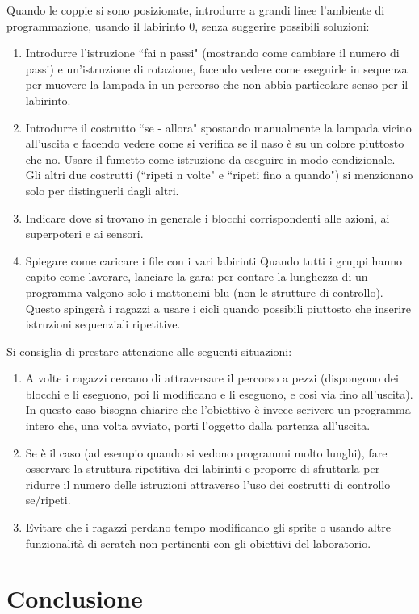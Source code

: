 \documentclass[12pt]{article}
\begin{document}
Quando le coppie si sono posizionate, introdurre a grandi linee l’ambiente di programmazione, usando il labirinto 0, senza suggerire possibili soluzioni:
\begin{enumerate}
\item Introdurre l’istruzione ``fai n passi" (mostrando come cambiare il numero di passi) e un’istruzione di rotazione, facendo vedere come eseguirle in sequenza per muovere la lampada in un percorso che non abbia particolare senso per il labirinto.
\item Introdurre il costrutto ``se - allora" spostando manualmente la lampada vicino all'uscita e facendo vedere come si veriﬁca se il naso è su un colore piuttosto che no. Usare il fumetto come istruzione da eseguire in modo condizionale. Gli altri due costrutti (``ripeti n volte" e ``ripeti ﬁno a quando") si menzionano solo per distinguerli dagli altri.
\item Indicare dove si trovano in generale i blocchi corrispondenti alle azioni, ai superpoteri e ai sensori.
\item Spiegare come caricare i ﬁle con i vari labirinti Quando tutti i gruppi hanno capito come lavorare, lanciare la gara: per contare la lunghezza di un programma valgono solo i mattoncini blu (non le strutture di controllo). Questo spingerà i ragazzi a usare i cicli quando possibili piuttosto che inserire istruzioni sequenziali ripetitive.
\end{enumerate}

Si consiglia di prestare attenzione alle seguenti situazioni:
\begin{enumerate}
\item A volte i ragazzi cercano di attraversare il percorso a pezzi (dispongono dei blocchi e li eseguono, poi li modiﬁcano e li eseguono, e così via ﬁno all’uscita). In questo caso bisogna chiarire che l’obiettivo è invece scrivere un programma intero che, una volta avviato, porti l’oggetto dalla partenza all’uscita.
\item Se è il caso (ad esempio quando si vedono programmi molto lunghi), fare osservare la struttura ripetitiva dei labirinti e proporre di sfruttarla per ridurre il numero delle istruzioni attraverso l’uso dei costrutti di controllo se/ripeti.
\item Evitare che i ragazzi perdano tempo modiﬁcando gli sprite o usando altre funzionalità di scratch non pertinenti con gli obiettivi del laboratorio.
\end{enumerate}

\section{Conclusione}
\end{document}
